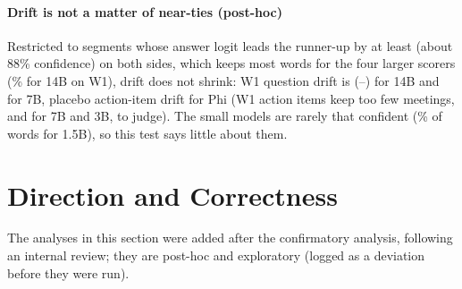 \documentclass[conference]{IEEEtran}
\begin{document}
\paragraph*{Drift is not a matter of near-ties (post-hoc)} Restricted to segments whose answer logit leads the
runner-up by at least \nConfMargin{} (about 88\% confidence) on both sides, which keeps most words for the four larger
scorers (\nConfWoneQtwoFourteenkept\% for 14B on W1), drift does not shrink: W1 question drift is
\nConfWoneQtwoFourteenmed{} (\nConfWoneQtwoFourteenlo--\nConfWoneQtwoFourteenhi) for 14B and \nConfWoneQtwoSevenmed{}
for 7B, placebo action-item drift \nConfWtwoQonePhimed{} for Phi (W1 action items keep too few meetings,
\nConfWoneQoneSevenn{} and \nConfWoneQoneThreen{} for 7B and 3B, to judge). The small models are rarely that confident
(\nConfWoneQtwokept\% of words for 1.5B), so this test says little about them.
\begin{table}[t]
\centering\footnotesize
\caption{Post-hoc: every scorer on held-out data. Base share: median old action-item share. $D$: median relative
drift of the primary query (W1, W2: action items; W4: dated text). $|\Delta|$: median absolute change in percentage
points, regardless of direction. Question F1: word-level agreement with human dialogue-act labels on manual segments.
A superscript gives the number of units that pass the 0.02 guard where it is below the preregistered minimum (14
meetings, 180 articles); those cells are descriptive.}
\label{tab:models}

\end{table}
\begin{table}[t]
\centering\footnotesize
\caption{Median relative drift $D$ on held-out units for every query and workload, for the 0.5B, 1.5B and 3B models
(exploratory, except the primary queries of W1, W2 and W4 with the 1.5B model; the 3B model is post-hoc and was not
run on W3; 7B, 14B, 32B and Phi are in Table~\ref{tab:models}). ``--'': no unit passes the 0.02
guard. Intervals and absolute changes are in the released tables.}
\label{tab:all}

\end{table}

\section{Direction and Correctness}\label{sec:dir}
The analyses in this section were added after the confirmatory analysis, following an internal review; they are
post-hoc and exploratory (logged as a deviation before they were run).
\end{document}
